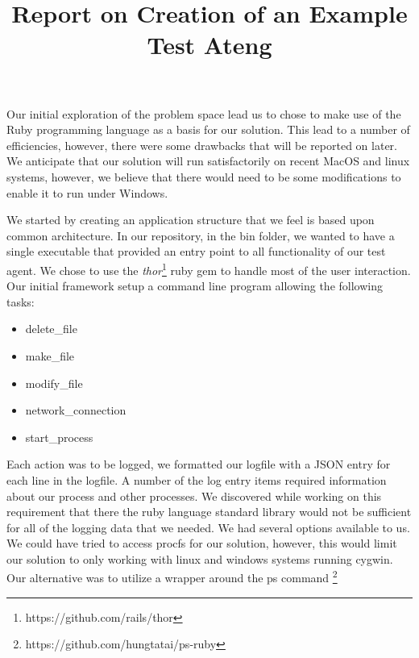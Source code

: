 \documentclass[11pt]{article}
\title{Report on Creation of an Example Test Ateng}
\begin{document}
Our initial exploration of the problem space lead us to chose to make use of the Ruby programming language as a basis for our solution. This lead to a number of efficiencies, however, there were some drawbacks that will be reported on later. We anticipate that our solution will run satisfactorily on recent MacOS and linux systems, however, we believe that there would need to be some modifications to enable it to run under Windows. 

We started by creating an application structure that we feel is based upon common architecture. In our repository, in the bin folder, we wanted to have a single executable that provided an entry point to all functionality of our test agent. We  chose to use the \textit{thor}\footnote{https://github.com/rails/thor} ruby gem  to handle most of the user interaction. Our initial framework setup a command line program allowing the following tasks: 
\begin{itemize}
	\item delete\_file 
	\item make\_file
	\item modify\_file
	\item network\_connection
	\item start\_process
\end{itemize}

Each action was to be logged, we formatted our logfile with a JSON entry for each line in the logfile. A number of the log entry items required information about our process and other processes. We discovered while working on this requirement that there the ruby language standard library would not be sufficient for all of the logging data that we needed. We had several options available to us. We could have tried to access procfs for our solution, however, this would limit our solution to only working with linux and windows systems running cygwin. Our alternative was to utilize a wrapper around the ps command \footnote{https://github.com/hungtatai/ps-ruby}
\end{document}
